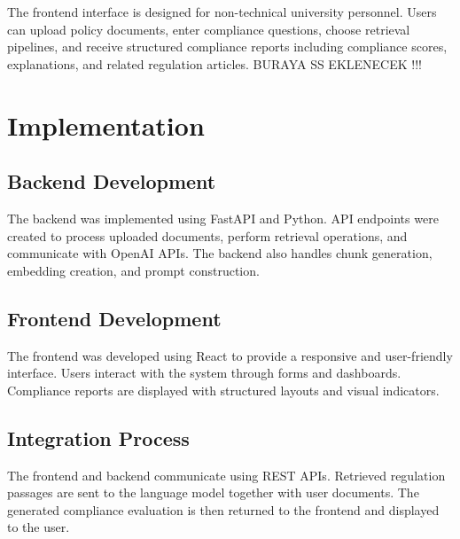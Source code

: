 \documentclass[a4paper,12pt]{article}
\begin{document}
\hspace{0.5cm} The frontend interface is designed for non-technical university personnel. Users can upload policy documents, enter compliance questions, choose retrieval pipelines, and receive structured compliance reports including compliance scores, explanations, and related regulation articles.
BURAYA SS EKLENECEK !!!


\section{Implementation}

\subsection{Backend Development}

\hspace{0.5cm} The backend was implemented using FastAPI and Python. API endpoints were created to process uploaded documents, perform retrieval operations, and communicate with OpenAI APIs. The backend also handles chunk generation, embedding creation, and prompt construction.

\subsection{Frontend Development}

\hspace{0.5cm} The frontend was developed using React to provide a responsive and user-friendly interface. Users interact with the system through forms and dashboards. Compliance reports are displayed with structured layouts and visual indicators.

\subsection{Integration Process}

\hspace{0.5cm} The frontend and backend communicate using REST APIs. Retrieved regulation passages are sent to the language model together with user documents. The generated compliance evaluation is then returned to the frontend and displayed to the user.

\end{document}
